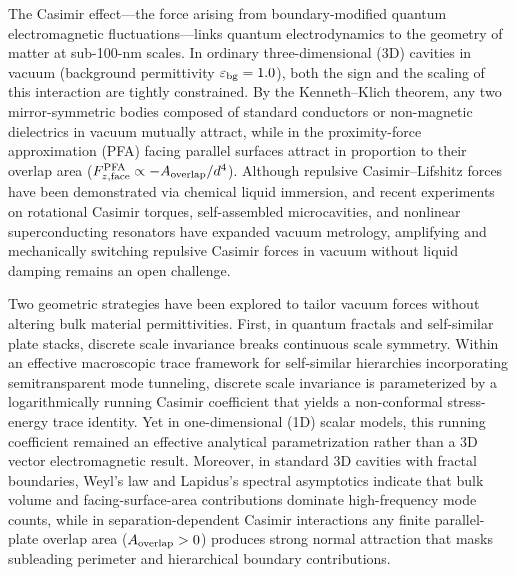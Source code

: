 \documentclass[pdflatex,sn-nature]{sn-jnl}
\begin{document}
\maketitle

The Casimir effect---the force arising from boundary-modified quantum electromagnetic fluctuations\cite{casimir1948,bordag2009}---links quantum electrodynamics to the geometry of matter at sub-100-nm scales. In ordinary three-dimensional (3D) cavities in vacuum (background permittivity $\varepsilon_{\rm bg}=1.0$), both the sign and the scaling of this interaction are tightly constrained. By the Kenneth--Klich theorem\cite{kennethklich2006}, any two mirror-symmetric bodies composed of standard conductors or non-magnetic dielectrics in vacuum mutually attract, while in the proximity-force approximation (PFA) facing parallel surfaces attract in proportion to their overlap area ($F_{z,\rm face}^{\rm PFA} \propto -A_{\rm overlap}/d^4$). Although repulsive Casimir--Lifshitz forces have been demonstrated via chemical liquid immersion\cite{munday2009}, and recent experiments on rotational Casimir torques\cite{somers2018}, self-assembled microcavities\cite{munkhbat2021}, and nonlinear superconducting resonators\cite{dejong2026} have expanded vacuum metrology, amplifying and mechanically switching repulsive Casimir forces in vacuum without liquid damping remains an open challenge\cite{rodriguez2011}.

Two geometric strategies have been explored to tailor vacuum forces without altering bulk material permittivities. First, in quantum fractals\cite{kempkes2019,xu2021} and self-similar plate stacks\cite{akkermans2010,shajesh2016,shajesh2017}, discrete scale invariance breaks continuous scale symmetry. Within an effective macroscopic trace framework for self-similar hierarchies incorporating semitransparent mode tunneling\cite{milton2004,milton2016,gordon2026prd}, discrete scale invariance is parameterized by a logarithmically running Casimir coefficient that yields a non-conformal stress-energy trace identity. Yet in one-dimensional (1D) scalar models\cite{gordon2026prd}, this running coefficient remained an effective analytical parametrization rather than a 3D vector electromagnetic result. Moreover, in standard 3D cavities with fractal boundaries, Weyl's law and Lapidus's spectral asymptotics\cite{lapidus1991} indicate that bulk volume and facing-surface-area contributions dominate high-frequency mode counts, while in separation-dependent Casimir interactions any finite parallel-plate overlap area ($A_{\rm overlap} > 0$) produces strong normal attraction that masks subleading perimeter and hierarchical boundary contributions.
\end{document}
